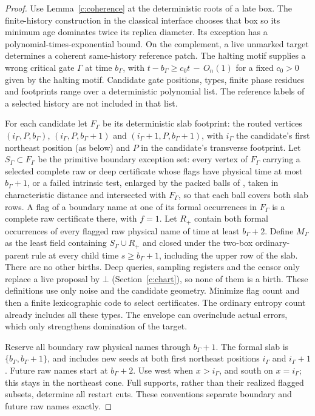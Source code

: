 \begin{proof}
Use Lemma~\ref{c:coherence} at the deterministic roots of a late box.
The finite-history construction in the classical interface chooses that
box so its minimum age dominates twice its replica diameter. Its
exception has a polynomial-times-exponential bound. On the complement,
a live unmarked target determines a coherent same-history reference
patch. The halting motif supplies a wrong critical gate \(\Gamma\) at
time \(b_\Gamma\), with
\(t-b_\Gamma\ge c_0t\,-\,O_n(1)\) for a fixed \(c_0>0\) given by the
halting motif. Candidate gate positions, types, finite
phase residues and footprints range over a deterministic polynomial
list. The reference labels of a selected history are not included in
that list.

For each candidate let \(F_\Gamma\) be its deterministic slab footprint:
the routed vertices \((i_\Gamma,P,b_\Gamma)\), \((i_\Gamma,P,b_\Gamma+1)\)
and \((i_\Gamma+1,P,b_\Gamma+1)\), with \(i_\Gamma\) the candidate's first northeast
position (as below) and \(P\) in the candidate's
transverse footprint. Let \(S_\Gamma\subset F_\Gamma\) be the primitive
boundary exception set: every vertex of \(F_\Gamma\) carrying a selected
complete raw or deep certificate whose flags have physical time at most
\(b_\Gamma+1\), or a failed intrinsic test, enlarged by the packed balls
of \cite[Lemma~11.6]{DMNoise2026}, taken in characteristic distance and
intersected with \(F_\Gamma\), so that each ball covers both slab rows.
A flag of a boundary name at one of its formal occurrences in
\(F_\Gamma\) is a complete raw certificate there, with \(f=1\). Let
\(R_+\) contain both formal occurrences of every flagged raw physical
name of time at least \(b_\Gamma+2\).
Define \(M_\Gamma\) as the least field containing \(S_\Gamma\cup R_+\)
and closed under the two-box ordinary-parent rule at every child time
\(s\ge b_\Gamma+1\), including the upper row of the slab.
There are no other births. Deep queries, sampling
registers and the censor only replace a live proposal by \(\bot\)
(Section~\ref{c:chart}), so none of them is a birth. These definitions use only noise and the
candidate geometry. Minimize flag count and then a finite lexicographic
code to select certificates. The ordinary entropy count already includes
all these types. The envelope can overinclude actual errors, which only
strengthens domination of the target.

Reserve all boundary raw physical names through \(b_\Gamma+1\). The
formal slab is \(\{b_\Gamma,b_\Gamma+1\}\), and includes new seeds at
both first northeast positions \(i_\Gamma\) and \(i_\Gamma+1\).
Future raw names start at \(b_\Gamma+2\). Use west when
\(x>i_\Gamma\), and south on \(x=i_\Gamma\); this stays in the
northeast cone. Full supports, rather than their realized flagged subsets,
determine all restart cuts. These conventions separate boundary and
future raw names exactly.


\end{proof}
